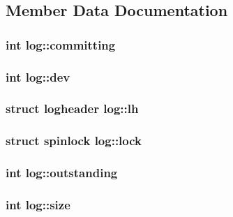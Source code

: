 \subsection{Member Data Documentation}
\subsubsection[{\texorpdfstring{committing}{committing}}]{\setlength{\rightskip}{0pt plus 5cm}int log\+::committing}\hypertarget{structlog_afc034b98b98897c179ca8fae8e2ee181}{}\label{structlog_afc034b98b98897c179ca8fae8e2ee181}
\subsubsection[{\texorpdfstring{dev}{dev}}]{\setlength{\rightskip}{0pt plus 5cm}int log\+::dev}\hypertarget{structlog_aebeeb9df7326549fb5d8b7221c9b0aa3}{}\label{structlog_aebeeb9df7326549fb5d8b7221c9b0aa3}
\subsubsection[{\texorpdfstring{lh}{lh}}]{\setlength{\rightskip}{0pt plus 5cm}struct {\bf logheader} log\+::lh}\hypertarget{structlog_a7808516ed2f708dcb13912b1e8fc20d9}{}\label{structlog_a7808516ed2f708dcb13912b1e8fc20d9}
\subsubsection[{\texorpdfstring{lock}{lock}}]{\setlength{\rightskip}{0pt plus 5cm}struct {\bf spinlock} log\+::lock}\hypertarget{structlog_a980a1d1aa9c60af7a82f297f8ab54d2e}{}\label{structlog_a980a1d1aa9c60af7a82f297f8ab54d2e}
\subsubsection[{\texorpdfstring{outstanding}{outstanding}}]{\setlength{\rightskip}{0pt plus 5cm}int log\+::outstanding}\hypertarget{structlog_addfc1fc09a124978bd7e2a23a19d733d}{}\label{structlog_addfc1fc09a124978bd7e2a23a19d733d}
\subsubsection[{\texorpdfstring{size}{size}}]{\setlength{\rightskip}{0pt plus 5cm}int log\+::size}\hypertarget{structlog_a2257e716d4b77efd0524286cf5772a41}{}\label{structlog_a2257e716d4b77efd0524286cf5772a41}
